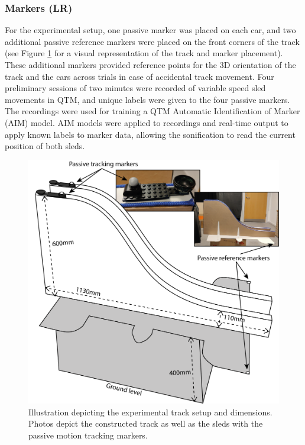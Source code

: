 \documentclass[10pt,a4paper,onecolumn]{article}
\begin{document}
\hypertarget{markers-lr}{%
\subsubsection{Markers (LR)}\label{markers-lr}}

For the experimental setup, one passive marker was placed on each car, and two additional passive reference markers were placed on the front corners of the track (see Figure \ref{fig:track-setup} for a visual representation of the track and marker placement). These additional markers provided reference points for the 3D orientation of the track and the cars across trials in case of accidental track movement. Four preliminary sessions of two minutes were recorded of variable speed sled movements in QTM, and unique labels were given to the four passive markers. The recordings were used for training a QTM Automatic Identification of Marker (AIM) model. AIM models were applied to recordings and real-time output to apply known labels to marker data, allowing the sonification to read the current position of both sleds.

\begin{figure}[h]

{\centering \includegraphics[width=1\linewidth]{figures/track_dimensions} 

}

\caption{Illustration depicting the experimental track setup and dimensions. Photos depict the constructed track as well as the sleds with the passive motion tracking markers.}\label{fig:track-setup}
\end{figure}
\end{document}
